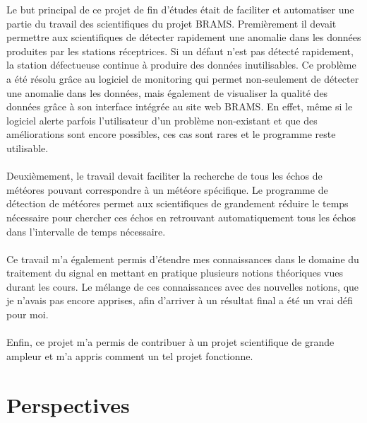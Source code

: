 \documentclass[11pt]{article}
\begin{document}
Le but principal de ce projet de fin d'études était de faciliter et automatiser une partie du travail des scientifiques du projet BRAMS.
Premièrement il devait permettre aux scientifiques de détecter rapidement une anomalie dans les données produites par les stations réceptrices.
Si un défaut n'est pas détecté rapidement, la station défectueuse continue à produire des données inutilisables.
Ce problème a été résolu grâce au logiciel de monitoring qui permet non-seulement de détecter une anomalie dans les données, mais également de visualiser la qualité des données grâce à son interface intégrée au site web BRAMS.
En effet, même si le logiciel alerte parfois l'utilisateur d'un problème non-existant et que des améliorations sont encore possibles, ces cas sont rares et le programme reste utilisable.\\
\\
Deuxièmement, le travail devait faciliter la recherche de tous les échos de météores pouvant correspondre à un météore spécifique.
Le programme de détection de météores permet aux scientifiques de grandement réduire le temps nécessaire pour chercher ces échos en retrouvant automatiquement tous les échos dans l'intervalle de temps nécessaire.\\
\\
Ce travail m'a également permis d'étendre mes connaissances dans le domaine du traitement du signal en mettant en pratique plusieurs notions théoriques vues durant les cours.
Le mélange de ces connaissances avec des nouvelles notions, que je n'avais pas encore apprises, afin d'arriver à un résultat final a été un vrai défi pour moi.\\
\\
Enfin, ce projet m'a permis de contribuer à un projet scientifique de grande ampleur et m'a appris comment un tel projet fonctionne.

\newpage

\section{Perspectives}
\end{document}
